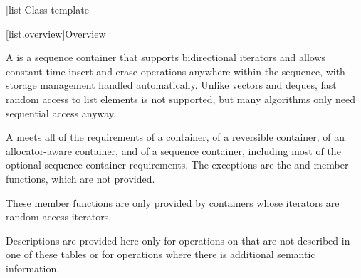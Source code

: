 [list]{Class template }

[list.overview]{Overview}

\pnum
{}%
A
is a sequence container that supports
bidirectional iterators and allows constant time insert and erase
operations anywhere within the sequence, with storage management handled
automatically. Unlike vectors and deques,
fast random access to list elements is not supported, but many
algorithms only need sequential access anyway.

\pnum
A  meets all of the requirements
of a container,
of a reversible container,
of an allocator-aware container, and
of a sequence container,
including most of the optional sequence container
requirements.
The exceptions are the
and
member functions, which are not provided.
\begin{footnote}
These member functions
are only provided by containers whose iterators
are random access iterators.
\end{footnote}
Descriptions are provided here only for operations on
that are not described in one of these tables
or for operations where there is additional semantic information.

